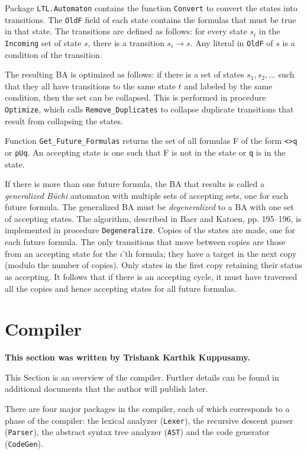 \documentclass[11pt]{article}
\newcommand*{\p}[1]{\texttt{#1}}
\begin{document}
Package \p{LTL.Automaton} contains the function \p{Convert} to convert
the states into transitions. The \p{OldF} field of each state contains
the formulas that must be true in that state. The transitions are
defined as follows: for every state $s_{i}$ in the \p{Incoming} set of
state $s$, there is a transition $s_{i}\rightarrow s$. Any literal in
\p{OldF} of $s$ is a condition of the transition.

The resulting BA is optimized as follows: if there is a set of states
$s_{1}, s_{2}, \ldots$ such that they all have transitions to the same
state $t$ and labeled by the same condition, then the set can be collapsed.
This is performed in procedure \p{Optimize}, which calls
\p{Remove\_Duplicates} to collapse duplicate transitions that result
from collapsing the states.

Function \p{Get\_Future\_Formulas} returns the set of all formulas F of
the form \p{<>q} or \p{pUq}. An accepting state is one such that F is
not in the state or \p{q} is in the state.

If there is more than one future formula, the BA that results is called
a \emph{generalized B\"{u}chi} automaton with multiple sets of accepting
sets, one for each future formula. The generalized BA must be
\emph{degeneralized} to a BA with one set of accepting states. The
algorithm, described in Baer and Katoen, pp. 195--196, is implemented in
procedure \p{Degeneralize}. Copies of the states are made, one for each
future formula. The only transitions that move between copies are those
from an accepting state for the $i$'th formula; they have a target in
the next copy (modulo the number of copies). Only states in the first
copy retaining their status as accepting. It follows that if there is an
accepting cycle, it must have traversed all the copies and hence
accepting states for all future formulas.

\newpage

\section{Compiler}
\textbf{This section was written by Trishank Karthik Kuppusamy.}

This Section is an overview of the compiler. Further details can be
found in additional documents that the author will publish later.

There are four major packages in the compiler, each of which
corresponds to a phase of the compiler: the lexical analyzer
(\p{Lexer}), the recursive descent parser (\p{Parser}), the abstract
syntax tree analyzer (\p{AST}) and the code generator (\p{CodeGen}).
\end{document}
